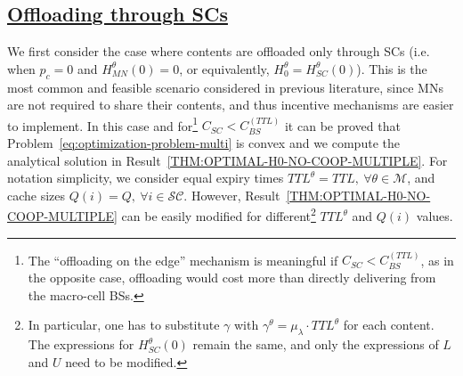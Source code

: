 \documentclass[10pt,conference,letterpaper]{IEEEtran}
\begin{document}
\subsection*{\underline{Offloading through SCs}}
We first consider the case where contents are offloaded only through SCs (i.e. when $p_{c}=0$ and $H_{MN}^{\theta}(0)=0$, or equivalently, $H_{0}^{\theta} = H_{SC}^{\theta}(0)$). This is the most common and feasible scenario considered in previous literature, since MNs are not required to share their contents, and thus incentive mechanisms are easier to implement. In this case and for\footnote{The ``offloading on the edge'' mechanism is meaningful if $C_{SC}<C_{BS}^{(TTL)}$, as in the opposite case, offloading would cost more than directly delivering from the macro-cell BSs.} $C_{SC}<C_{BS}^{(TTL)}$ it can be proved that Problem~\ref{eq:optimization-problem-multi} is convex and we compute the analytical solution in Result~\ref{THM:OPTIMAL-H0-NO-COOP-MULTIPLE}. For notation simplicity, we consider equal expiry times $TTL^{\theta}=TTL, ~\forall\theta\in\mathcal{M}$, and cache sizes $Q(i)=Q,~\forall i\in\mathcal{SC}$. However, Result~\ref{THM:OPTIMAL-H0-NO-COOP-MULTIPLE} can be easily modified for different\footnote{In particular, one has to substitute $\gamma$ with $\gamma^{\theta}=\mu_{\lambda}\cdot TTL^{\theta}$ for each content. The expressions for $H_{SC}^{\theta}(0)$ remain the same, and only the expressions of $L$ and $U$ need to be modified.} $TTL^{\theta}$ and $Q(i)$ values.
\end{document}

